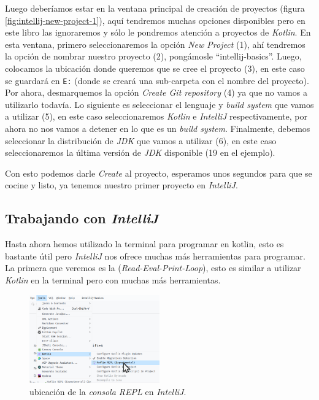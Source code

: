     Luego deberíamos estar en la ventana principal de creación de proyectos (figura 
    \ref{fig:intellij-new-project-1}), aquí tendremos muchas opciones disponibles pero en este
    libro las ignoraremos y sólo le pondremos atención a proyectos de \textit{Kotlin}.
    En esta ventana, primero seleccionaremos la opción \textit{New Project} (1), ahí tendremos la
    opción de nombrar nuestro proyecto (2), pongámosle \enquote{intellij-basics}.
    Luego, colocamos la ubicación donde queremos que se cree el proyecto (3), en este caso se 
    guardará en \texttt{E:\Code\Teaching} (donde se creará una sub-carpeta con el nombre
    del proyecto).
    Por ahora, desmarquemos la opción \textit{Create Git repository} (4) ya que no vamos a 
    utilizarlo todavía.
    Lo siguiente es seleccionar el lenguaje y \textit{build system} que vamos a utilizar (5), en
    este caso seleccionaremos \textit{Kotlin} e \textit{IntelliJ} respectivamente, por ahora no nos
    vamos a detener en lo que es un \textit{build system}.
    Finalmente, debemos seleccionar la distribución de \textit{JDK} que vamos a utilizar (6), en
    este caso seleccionaremos la última versión de \textit{JDK} disponible (19 en el ejemplo).

    Con esto podemos darle \textit{Create} al proyecto, esperamos unos segundos para que se cocine
    y listo, ya tenemos nuestro primer proyecto en \textit{IntelliJ}.

  \subsection{Trabajando con \textit{IntelliJ}}
    \label{sec:intellij-work}

    Hasta ahora hemos utilizado la terminal para programar en kotlin, esto es bastante útil pero
    \textit{IntelliJ} nos ofrece muchas más herramientas para programar.
    La primera que veremos es la  (\textit{Read-Eval-Print-Loop}), esto es
    similar a utilizar \textit{Kotlin} en la terminal pero con muchas más herramientas.

    \begin{figure}[ht!]
      \centering
      \includegraphics[width=0.5\textwidth]{img/Por_algo_se_empieza/idea64_tools_repl.png}
      \caption{ubicación de la \textit{consola REPL} en \textit{IntelliJ}.}
      \label{fig:tools-repl}
    \end{figure}

